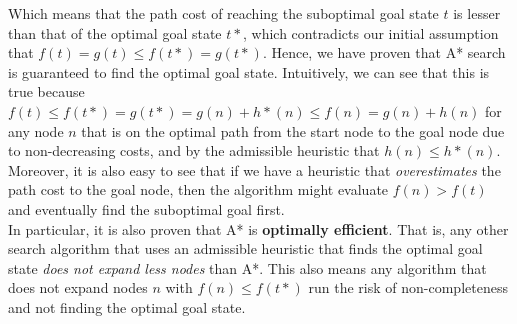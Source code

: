 \documentclass[12pt]{article}
\begin{document}
Which means that the path cost of reaching the suboptimal goal state $t$ is lesser than that of the optimal goal state $t*$, which contradicts our initial assumption that $f(t) = g(t) \leq f(t*) = g(t*)$. Hence, we have proven that A* search is guaranteed to find the optimal goal state. Intuitively, we can see that this is true because $f(t) \leq f(t*) = g(t*) = g(n) + h*(n)  \leq f(n) = g(n) + h(n)$ for any node $n$ that is on the optimal path from the start node to the goal node due to non-decreasing costs, and by the admissible heuristic that $h(n) \leq h*(n)$. Moreover, it is also easy to see that if we have a heuristic that \textit{overestimates} the path cost to the goal node, then the algorithm might evaluate $f(n) > f(t)$ and eventually find the suboptimal goal first.\\

In particular, it is also proven that A* is \textbf{optimally efficient}. That is, any other search algorithm that uses an admissible heuristic that finds the optimal goal state \textit{does not expand less nodes} than A*. This also means any algorithm that does not expand nodes $n$ with $f(n) 
\leq f(t*)$ run the risk of non-completeness and not finding the optimal goal state.
\end{document}

